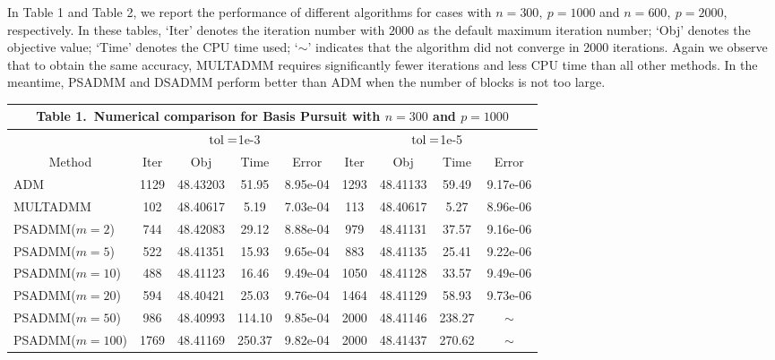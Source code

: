 \documentclass{mcom-l}
\theoremstyle{definition}
\theoremstyle{remark}
\numberwithin{equation}{section}
\begin{document}
In Table 1 and Table 2, we report the performance of different algorithms for cases with $n=300,\ p=1000$ and $n=600,\ p=2000$, respectively. In these tables, `Iter' denotes the iteration number with $2000$ as the default maximum iteration number; `Obj' denotes the objective value; `Time' denotes the CPU time used; `$\sim$' indicates that the algorithm did not converge in 2000 iterations. Again we observe that to obtain the same accuracy, MULTADMM  requires significantly fewer iterations and less CPU time than all other methods. In the meantime, PSADMM and DSADMM perform better than ADM when the number of blocks is not too large.

\begin{center}
{\scriptsize\vskip 0.1cm
\begin{tabular}{|l|| c| c| c| c|| c| c| c| c|}
\multicolumn{9}{c}{\small{Table 1.\ Numerical comparison for Basis Pursuit with $n=300$ and $p=1000$}}\\
\hline
   \multicolumn{1}{|c||}{}&\multicolumn{4}{c||}{$\hbox{tol}=$1e-3}&\multicolumn{4}{c|}{$\hbox{tol}=$1e-5} \\
\hline
   \multicolumn{1}{|c||}{\hbox{Method}}&\hbox{Iter}&\hbox{Obj}&\hbox{Time}&\hbox{Error}&\hbox{Iter}&\hbox{Obj}&\hbox{Time}&\hbox{Error} \\
\hline
ADM                 &1129   & 48.43203 & 51.95         & 8.95e-04  &1293   & 48.41133 & 59.49     & 9.17e-06\\
\hline
MULTADMM            &102    & 48.40617 & 5.19          & 7.03e-04  &113    & 48.40617 & 5.27      & 8.96e-06\\
\hline
PSADMM($m=    2$)   &  744  & 48.42083 & 29.12         & 8.88e-04  & 979   & 48.41131 & 37.57     & 9.16e-06\\
PSADMM($m=    5$)   &  522  & 48.41351 & 15.93         & 9.65e-04  & 883   & 48.41135 & 25.41     & 9.22e-06\\
PSADMM($m=   10$)   &  488  & 48.41123 & 16.46         & 9.49e-04  & 1050  & 48.41128 & 33.57     & 9.49e-06\\
PSADMM($m=   20$)   &  594  & 48.40421 & 25.03         & 9.76e-04  & 1464  & 48.41129 & 58.93     & 9.73e-06\\
PSADMM($m=   50$)   &  986  & 48.40993 & 114.10        & 9.85e-04  & 2000  & 48.41146 & 238.27    & $\sim$\\%
PSADMM($m=  100$)   & 1769  & 48.41169 & 250.37        & 9.82e-04  & 2000  & 48.41437 & 270.62    & $\sim$\\%

\end{tabular}}
\end{center}
\end{document}

